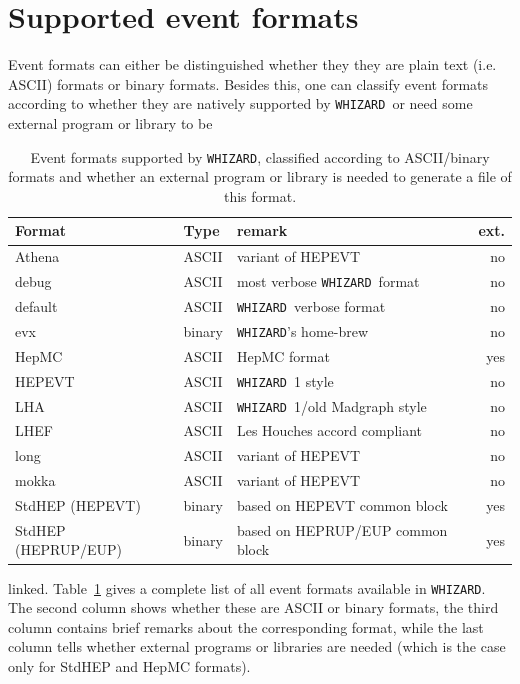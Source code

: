 \documentclass[12pt]{book}
\newcommand{\whizard}{\texttt{WHIZARD}}
\begin{document}

\section{Supported event formats}
\label{sec:eventformats}

Event formats can either be distinguished whether they they are plain
text (i.e. ASCII) formats or binary formats. Besides this, one can
classify event formats according to whether they are natively
supported by \whizard\ or need some external program or library to be
\begin{table}
  \begin{center}
    \begin{tabular}{|l||l|l|r|}\hline
      Format & Type & remark & ext. \\\hline
      Athena & ASCII & variant of HEPEVT & no
      \\
      debug & ASCII & most verbose \whizard\ format & no
      \\
      default & ASCII & \whizard\ verbose format & no
      \\
      evx   & binary & \whizard's home-brew & no
      \\
      HepMC & ASCII & HepMC format & yes 
      \\
      HEPEVT & ASCII & \whizard~1 style & no
      \\
      LHA  & ASCII & \whizard~1/old Madgraph style &no 
      \\
      LHEF & ASCII & Les Houches accord compliant & no
      \\
      long & ASCII & variant of HEPEVT & no 
      \\
      mokka & ASCII & variant of HEPEVT & no
      \\
      StdHEP (HEPEVT) & binary & based on HEPEVT common block  & yes
      \\
      StdHEP (HEPRUP/EUP) & binary & based on HEPRUP/EUP common block
      & yes \\
      \hline
    \end{tabular}    
  \end{center}
  \caption{\label{tab:eventformats}
    Event formats supported by \whizard, classified according to
    ASCII/binary formats and whether an external program or library is
    needed to generate a file of this format. 
  }
\end{table}
linked. Table~\ref{tab:eventformats} gives a complete list of all
event formats available in \whizard. The second column shows whether
these are ASCII or binary formats, the third column contains brief
remarks about the corresponding format, while the last column tells
whether external programs or libraries are needed (which is the case
only for StdHEP and HepMC formats). 
\end{document}
